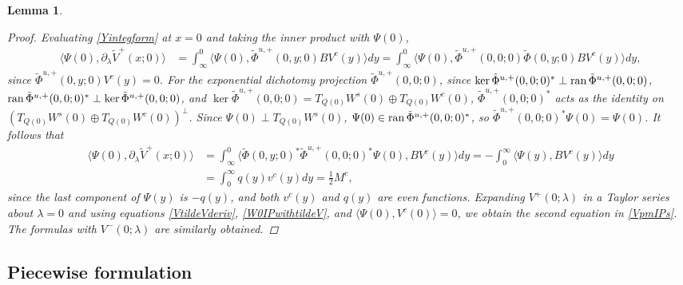 \documentclass[10pt,reqno]{amsart}
\theoremstyle{plain}
\newtheorem{lemma}[theorem]{Lemma}
\theoremstyle{definition}
\theoremstyle{remark}
\numberwithin{theorem}{section}
\numberwithin{equation}{section}
\begin{document}
\begin{lemma}
\begin{proof}
Evaluating \cref{Yintegform} at $x = 0$ and taking the inner product with $\Psi(0)$, 
\begin{align*}
\langle \Psi(0), \partial_\lambda \tilde{V}^+(x; 0)  \rangle
&= \int_{\infty}^0 \langle \Psi(0), \tilde{\Phi}^{u,+}(0,y; 0) B V^c(y) \rangle dy
= \int_{\infty}^0 \langle \Psi(0), \tilde{\Phi}^{u,+}(0,0; 0) \tilde{\Phi}(0,y; 0) B V^c(y) \rangle dy,
\end{align*}
since $\tilde{\Phi}^{u,+}(0,y; 0) V^c(y) = 0$. For the exponential dichotomy projection $\tilde{\Phi}^{u,+}(0,0; 0)$, since $\mathop\mathrm{ker}\nolimits \tilde{\Phi}^{u,+}(0, 0; 0)^* \perp \operatorname{ran} \tilde{\Phi}^{u,+}(0, 0; 0)$, $\operatorname{ran} \tilde{\Phi}^{u,+}(0, 0; 0)^* \perp \mathop\mathrm{ker}\nolimits \tilde{\Phi}^{u,+}(0, 0; 0)$, and $\ker \tilde{\Phi}^{u,+}(0, 0; 0) = T_{Q(0)} W^s(0) \oplus T_{Q(0)} W^c(0)$, $\tilde{\Phi}^{u,+}(0, 0; 0)^*$ acts as the identity on $(T_{Q(0)} W^s(0) \oplus T_{Q(0)} W^c(0))^\perp$. Since $\Psi(0) \perp T_{Q(0)} W^s(0)$, $\Psi(0) \in \operatorname{ran} \tilde{\Phi}^{u,+}(0, 0; 0)^*$, so $\tilde{\Phi}^{u,+}(0, 0; 0)^* \Psi(0) = \Psi(0)$. It follows that
\begin{align*}
\langle \Psi(0), \partial_\lambda \tilde{V}^+(x; 0)  \rangle
&= \int_{\infty}^0 \langle \tilde{\Phi}(0,y; 0)^* \tilde{\Phi}^{u,+}(0,0; 0)^* \Psi(0), B V^c(y) \rangle dy = -\int_0^\infty \langle \Psi(y), B V^c(y) \rangle dy \\
&= \int_0^\infty q(y) v^c(y) dy = \frac{1}{2}M^c,
\end{align*}
since the last component of $\Psi(y)$ is $-q(y)$, and both $v^c(y)$ and $q(y)$ are even functions. Expanding $V^+(0; \lambda)$ in a Taylor series about $\lambda = 0$ and using equations \cref{VtildeVderiv}, \cref{W0IPwithtildeV}, and $\langle \Psi(0), V^c(0)\rangle = 0$, we obtain the second equation in \cref{VpmIPs}. The formulas with $V^-(0; \lambda)$ are similarly obtained.
\end{proof}
\end{lemma}

\subsection{Piecewise formulation}
\end{document}

